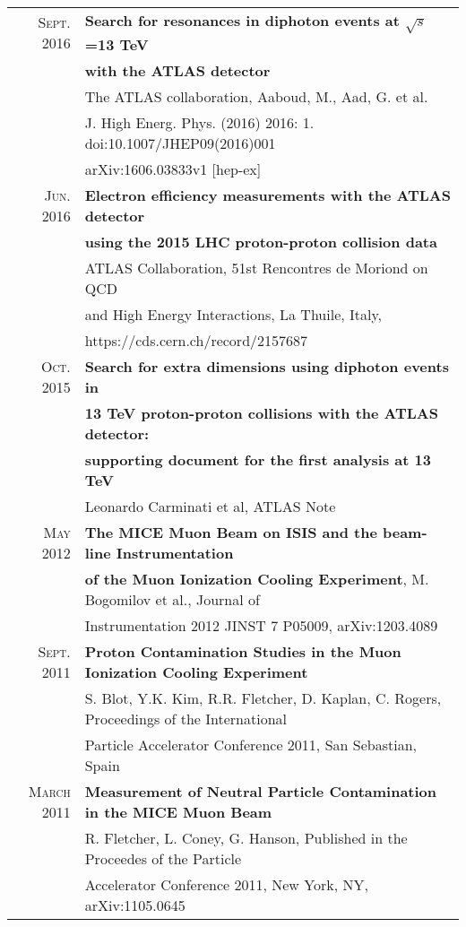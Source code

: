 \documentclass[a4paper,10pt]{article} %
\begin{document}
\begin{tabular}{rl}
\textsc{Sept.} 2016 & \textbf{Search for resonances in diphoton events at $\sqrt{s}$=13 TeV} \\
									& \textbf{with the ATLAS detector} \\
									& The ATLAS collaboration, Aaboud, M., Aad, G. et al.  \\
									& J. High Energ. Phys. (2016) 2016: 1. doi:10.1007/JHEP09(2016)001 \\
									& arXiv:1606.03833v1 [hep-ex] \\
\textsc{Jun.} 2016 & \textbf{Electron efficiency measurements with the ATLAS detector} \\
									& \textbf{using the 2015 LHC proton-proton collision data} \\
									& ATLAS Collaboration, 51st Rencontres de Moriond on QCD \\
									& and High Energy Interactions, La Thuile, Italy, \\
									& https://cds.cern.ch/record/2157687 \\
\textsc{Oct.} 2015 & \textbf{Search for extra dimensions using diphoton events in} \\
									 & \textbf{13 TeV proton-proton collisions with the ATLAS detector:} \\
									 & \textbf{supporting document for the first analysis at 13 TeV} \\
									 & Leonardo Carminati et al, ATLAS Note \\
\textsc{May} 2012  & \textbf{The MICE Muon Beam on ISIS and the beam-line Instrumentation} \\
                   & \textbf{of the Muon Ionization Cooling Experiment}, M. Bogomilov et al., Journal of \\
				   & Instrumentation 2012 JINST 7 P05009, arXiv:1203.4089 \\
\textsc{Sept.} 2011 & \textbf{Proton Contamination Studies in the Muon Ionization Cooling Experiment} \\
					& S. Blot, Y.K. Kim, R.R. Fletcher, D. Kaplan, C. Rogers, Proceedings of the International \\
					& Particle Accelerator Conference 2011, San Sebastian, Spain \\
\textsc{March} 2011 & \textbf{Measurement of Neutral Particle Contamination in the MICE Muon Beam}\\
					& R. Fletcher, L. Coney, G. Hanson, Published in the Proceedes of the Particle \\
                    & Accelerator Conference 2011, New York, NY, arXiv:1105.0645\\

\end{tabular}
\end{document}
